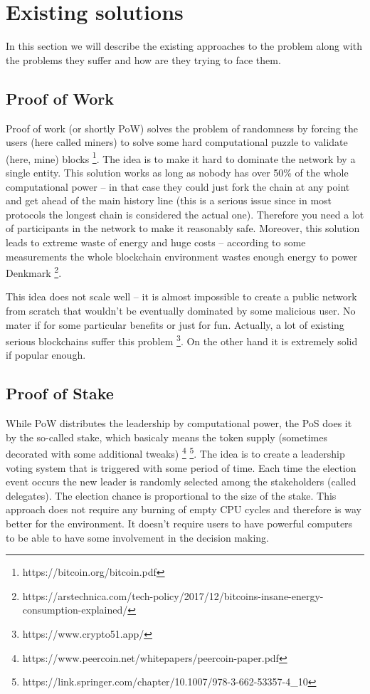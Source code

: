 
\section{Existing solutions}

In this section we will describe the existing approaches to the problem along
with the problems they suffer and how are they trying to face them.

\subsection{Proof of Work}

Proof of work (or shortly PoW) solves the problem of randomness by forcing the
users (here called miners) to solve some hard computational puzzle to validate
(here, mine) blocks \footnote{https://bitcoin.org/bitcoin.pdf}. The idea is to make it hard to dominate the network by a
single entity. This solution works as long as nobody has over 50\% of the whole
computational power – in that case they could just fork the chain at any point
and get ahead of the main history line (this is a serious issue since in most
protocols the longest chain is considered the actual one). Therefore you need a
lot of participants in the network to make it reasonably safe. Moreover, this
solution leads to extreme waste of energy and huge costs – according to some
measurements the whole blockchain environment wastes enough energy to power
Denkmark \footnote{https://arstechnica.com/tech-policy/2017/12/bitcoins-insane-energy-consumption-explained/}.

This idea does not scale well – it is almost impossible to create a public
network from scratch that wouldn't be eventually dominated by some malicious
user. No mater if for some particular benefits or just for fun. Actually, a lot
of existing serious blockchains suffer this problem
\footnote{https://www.crypto51.app/}. On the other hand it is extremely solid if
popular enough.

\subsection{Proof of Stake}

While PoW distributes the leadership by computational power, the PoS does it by
the so-called stake, which basicaly means the token supply (sometimes decorated
with some additional tweaks)
\footnote{https://www.peercoin.net/whitepapers/peercoin-paper.pdf}
\footnote{https://link.springer.com/chapter/10.1007/978-3-662-53357-4_10}.
The idea is to create a leadership voting system
that is triggered with some period of time. Each time the election event occurs
the new leader is randomly selected among the stakeholders (called delegates).
The election chance is proportional to the size of the stake. This approach does
not require any burning of empty CPU cycles and therefore is way better for the
environment. It doesn't require users to have powerful computers to be able to
have some involvement in the decision making.

